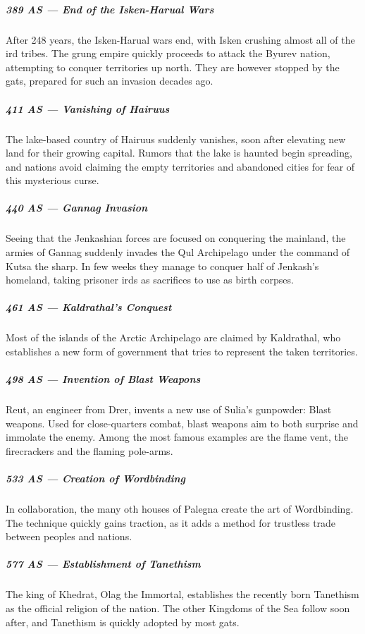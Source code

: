 \subparagraph{389 AS --- End of the Isken-Harual Wars} After 248 years, the Isken-Harual wars end, with Isken crushing almost all of the ird tribes.
The grung empire quickly proceeds to attack the Byurev nation, attempting to conquer territories up north.
They are however stopped by the gats, prepared for such an invasion decades ago.

\subparagraph{411 AS --- Vanishing of Hairuus} The lake-based country of Hairuus suddenly vanishes, soon after elevating new land for their growing capital.
Rumors that the lake is haunted begin spreading, and nations avoid claiming the empty territories and abandoned cities for fear of this mysterious curse.

\subparagraph{440 AS --- Gannag Invasion} Seeing that the Jenkashian forces are focused on conquering the mainland, the armies of Gannag suddenly invades the Qul Archipelago under the command of Kutsa the sharp.
In few weeks they manage to conquer half of Jenkash's homeland, taking prisoner irds as sacrifices to use as birth corpses.

\subparagraph{461 AS --- Kaldrathal's Conquest} Most of the islands of the Arctic Archipelago are claimed by Kaldrathal, who establishes a new form of government that tries to represent the taken territories.

\subparagraph{498 AS --- Invention of Blast Weapons} Reut, an engineer from Drer, invents a new use of Sulia's gunpowder: Blast weapons.
Used for close-quarters combat, blast weapons aim to both surprise and immolate the enemy.
Among the most famous examples are the flame vent, the firecrackers and the flaming pole-arms.

\subparagraph{533 AS --- Creation of Wordbinding} In collaboration, the many oth houses of Palegna create the art of Wordbinding.
The technique quickly gains traction, as it adds a method for trustless trade between peoples and nations.


\subparagraph{577 AS --- Establishment of Tanethism} The king of Khedrat, Olag the Immortal, establishes the recently born Tanethism as the official religion of the nation.
The other Kingdoms of the Sea follow soon after, and Tanethism is quickly adopted by most gats.

